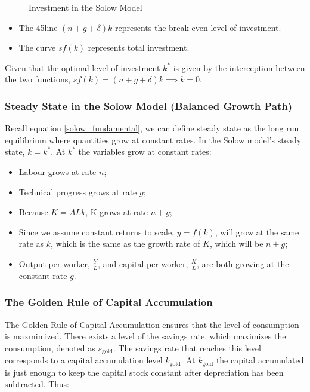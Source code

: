 \begin{figure}[H]
\centering
{}
\caption{Investment in the Solow Model}
\end{figure}

\begin{itemize}
    \item The 45\textdegree line $(n+g+ \delta)k$ represents the break-even level of investment.
    \item The curve $sf(k)$ represents total investment.
\end{itemize}

Given that the optimal level of investment $k^*$ is given by the interception between the two functions, $sf(k)=(n+g+ \delta)k \implies \dot{k}=0$.

\subsubsection{Steady State in the Solow Model (Balanced Growth Path)}

Recall equation \ref{solow_fundamental}, we can define steady state as the long run equilibrium where quantities grow at constant rates. In the Solow model's steady state, $k=k^{*}$. At $k^{*}$ the variables grow at constant rates: 
\begin{itemize}
    \item Labour grows at rate $n$;
    \item Technical progress grows at rate $g$;
    \item Because $K=ALk$, K grows at rate $n+g$;
    \item Since we assume constant returns to scale, $y=f(k)$, will grow at the same rate as $k$, which is the same as the growth rate of $K$, which will be $n+g$;
    \item Output per worker, $\frac{Y}{L}$, and capital per worker, $\frac{K}{L}$, are both growing at the constant rate $g$.
\end{itemize}




\subsubsection*{The Golden Rule of Capital Accumulation}
The Golden Rule of Capital Accumulation ensures that the level of consumption is maxmimized. There exists a level of the savings rate, which maximizes the consumption, denoted as $s_\text{gold}$. The savings rate that reaches this level corresponds to a capital accumulation level $k_\text{gold}$. At $k_\text{gold}$ the capital accumulated is just enough to keep the capital stock constant after depreciation has been subtracted. Thus:

